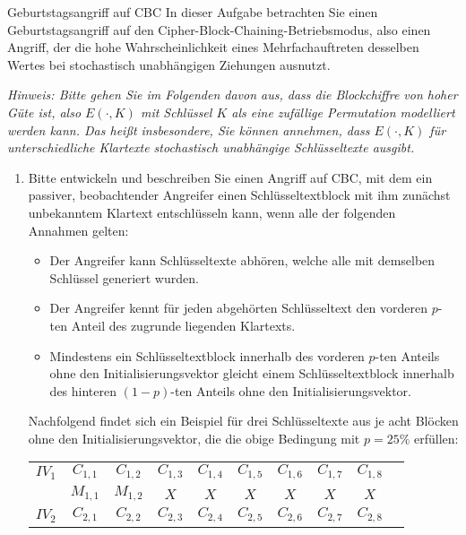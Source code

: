 \documentclass{article}
\begin{document}
\begin{exercise}{Geburtstagsangriff auf CBC}
  In dieser Aufgabe betrachten Sie einen Geburtstagsangriff auf den Cipher-Block-Chaining-Betriebsmodus, also einen Angriff, der die hohe Wahrscheinlichkeit eines Mehrfachauftreten desselben Wertes bei stochastisch unabhängigen Ziehungen ausnutzt.
  \par\textit{Hinweis: Bitte gehen Sie im Folgenden davon aus, dass die Blockchiffre von hoher Güte ist, also $E(\cdot, K)$ mit Schlüssel $K$ als eine zufällige Permutation modelliert werden kann. Das heißt insbesondere, Sie können annehmen, dass $E(\cdot, K)$ für unterschiedliche Klartexte stochastisch unabhängige Schlüsseltexte ausgibt.}
  
  \begin{enumerate}
    \item\label{ex:attack} Bitte entwickeln und beschreiben Sie einen Angriff auf CBC, mit dem ein passiver, beobachtender Angreifer einen Schlüsseltextblock mit ihm zunächst unbekanntem Klartext entschlüsseln kann, wenn alle der folgenden Annahmen gelten:
      \begin{itemize}
        \item Der Angreifer kann Schlüsseltexte abhören, welche alle mit demselben Schlüssel generiert wurden.
        \item Der Angreifer kennt für jeden abgehörten Schlüsseltext den vorderen $p$-ten Anteil des zugrunde liegenden Klartexts.
        \item Mindestens ein Schlüsseltextblock innerhalb des vorderen $p$-ten Anteils ohne den Initialisierungsvektor gleicht einem Schlüsseltextblock innerhalb des hinteren $(1-p)$-ten Anteils ohne den Initialisierungsvektor.
      \end{itemize}
      Nachfolgend findet sich ein Beispiel für drei Schlüsseltexte aus je acht Blöcken ohne den Initialisierungsvektor, die die obige Bedingung mit $p=25\%$ erfüllen:
      \begin{center}
        \begin{tabular}{c ccccccccc}
          $IV_1$ & $C_{1,1}$ & $C_{1,2}$ & $C_{1,3}$ & $C_{1,4}$ & $C_{1,5}$ & $C_{1,6}$ & $C_{1,7}$ & $C_{1,8}$\\
          & $M_{1,1}$ & $M_{1,2}$ & $X$ & $X$ & $X$ & $X$ & $X$ & $X$\vspace{.5em}\\
          $IV_2$ & $C_{2,1}$ & $C_{2,2}$ & $C_{2,3}$ & $C_{2,4}$ & $C_{2,5}$ & $C_{2,6}$ & $C_{2,7}$ & $C_{2,8}$\\

\end{tabular}
\end{center}
\end{enumerate}
\end{exercise}
\end{document}
